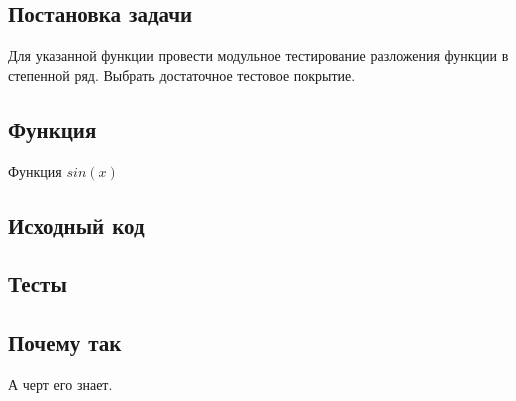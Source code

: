 \subsection{Постановка задачи}
Для указанной функции провести модульное тестирование разложения функции в степенной ряд. Выбрать достаточное тестовое покрытие.
\subsection{Функция}
Функция $ sin(x) $
\subsection{Исходный код}

\subsection{Тесты}

\subsection{Почему так}
А черт его знает.